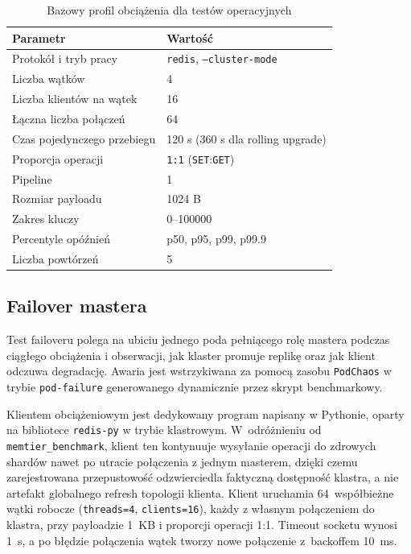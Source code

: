 \begin{table}[H]
\centering
\caption{Bazowy profil obciążenia dla testów operacyjnych}
\label{tab:profil_operacyjny}
\begin{tabularx}{\textwidth}{p{4.4cm}X}
\toprule
\textbf{Parametr} & \textbf{Wartość} \\
\midrule
Protokół i tryb pracy & \texttt{redis}, \texttt{--cluster-mode} \\
Liczba wątków & 4 \\
Liczba klientów na wątek & 16 \\
Łączna liczba połączeń & 64 \\
Czas pojedynczego przebiegu & 120 s (360 s dla rolling upgrade) \\
Proporcja operacji & \texttt{1:1} (\texttt{SET}:\texttt{GET}) \\
Pipeline & 1 \\
Rozmiar payloadu & 1024 B \\
Zakres kluczy & 0--100000 \\
Percentyle opóźnień & p50, p95, p99, p99.9 \\
Liczba powtórzeń & 5 \\
\bottomrule
\end{tabularx}
\end{table}

\subsection{Failover mastera}\label{subsec:failover}

Test failoveru polega na ubiciu jednego poda pełniącego rolę mastera podczas ciągłego obciążenia i obserwacji, jak klaster promuje replikę oraz jak klient odczuwa degradację. Awaria jest wstrzykiwana za pomocą zasobu \texttt{PodChaos} w trybie \texttt{pod-failure} generowanego dynamicznie przez skrypt benchmarkowy.

Klientem obciążeniowym jest dedykowany program napisany w Pythonie, oparty na bibliotece \texttt{redis-py} w trybie klastrowym. W~odróżnieniu od \texttt{memtier\_benchmark}, klient ten kontynuuje wysyłanie operacji do zdrowych shardów nawet po utracie połączenia z jednym masterem, dzięki czemu zarejestrowana przepustowość odzwierciedla faktyczną dostępność klastra, a nie artefakt globalnego refresh topologii klienta. Klient uruchamia 64~współbieżne wątki robocze (\texttt{threads=4}, \texttt{clients=16}), każdy z własnym połączeniem do klastra, przy payloadzie 1~KB i proporcji operacji 1:1. Timeout socketu wynosi 1~s, a po błędzie połączenia wątek tworzy nowe połączenie z~backoffem 10~ms.

